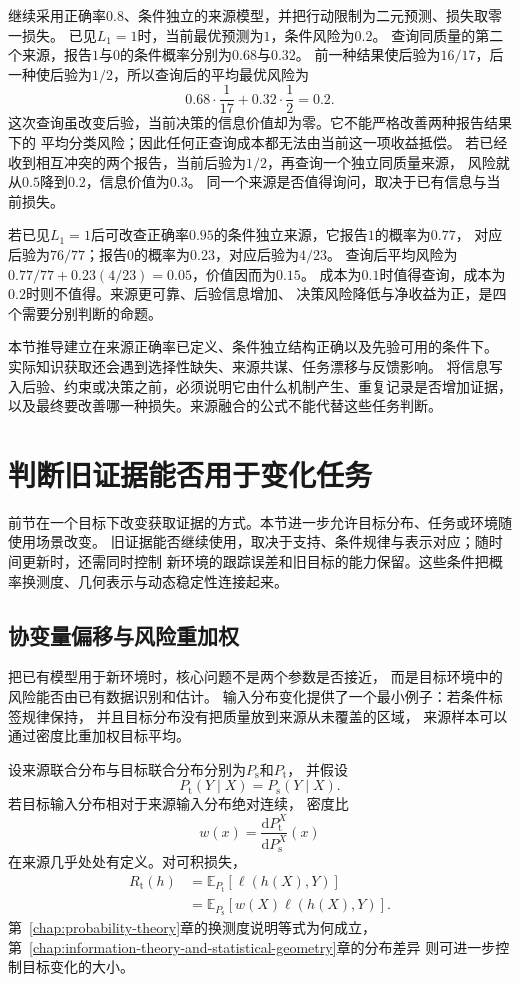 继续采用正确率$0.8$、条件独立的来源模型，并把行动限制为二元预测、损失取零一损失。
已见$L_1=1$时，当前最优预测为$1$，条件风险为$0.2$。
查询同质量的第二个来源，报告$1$与$0$的条件概率分别为$0.68$与$0.32$。
前一种结果使后验为$16/17$，后一种使后验为$1/2$，所以查询后的平均最优风险为
\[
  0.68\cdot\frac1{17}+0.32\cdot\frac12=0.2.
\]
这次查询虽改变后验，当前决策的信息价值却为零。它不能严格改善两种报告结果下的
平均分类风险；因此任何正查询成本都无法由当前这一项收益抵偿。
若已经收到相互冲突的两个报告，当前后验为$1/2$，再查询一个独立同质量来源，
风险就从$0.5$降到$0.2$，信息价值为$0.3$。
同一个来源是否值得询问，取决于已有信息与当前损失。

若已见$L_1=1$后可改查正确率$0.95$的条件独立来源，它报告$1$的概率为$0.77$，
对应后验为$76/77$；报告$0$的概率为$0.23$，对应后验为$4/23$。
查询后平均风险为$0.77/77+0.23(4/23)=0.05$，价值因而为$0.15$。
成本为$0.1$时值得查询，成本为$0.2$时则不值得。来源更可靠、后验信息增加、
决策风险降低与净收益为正，是四个需要分别判断的命题。

本节推导建立在来源正确率已定义、条件独立结构正确以及先验可用的条件下。
实际知识获取还会遇到选择性缺失、来源共谋、任务漂移与反馈影响。
将信息写入后验、约束或决策之前，必须说明它由什么机制产生、重复记录是否增加证据，
以及最终要改善哪一种损失。来源融合的公式不能代替这些任务判断。

\section{判断旧证据能否用于变化任务}
\label{sec:future-knowledge-evolution-transfer}

前节在一个目标下改变获取证据的方式。本节进一步允许目标分布、任务或环境随使用场景改变。
旧证据能否继续使用，取决于支持、条件规律与表示对应；随时间更新时，还需同时控制
新环境的跟踪误差和旧目标的能力保留。这些条件把概率换测度、几何表示与动态稳定性连接起来。

\subsection{协变量偏移与风险重加权}
\label{sec:future-input-shift-risk-reweighting}

把已有模型用于新环境时，核心问题不是两个参数是否接近，
而是目标环境中的风险能否由已有数据识别和估计。
输入分布变化提供了一个最小例子：若条件标签规律保持，
并且目标分布没有把质量放到来源从未覆盖的区域，
来源样本可以通过密度比重加权目标平均。

设来源联合分布与目标联合分布分别为$P_{\mathrm s}$和$P_{\mathrm t}$，
并假设
\[
  P_{\mathrm t}(Y\mid X)
  =
  P_{\mathrm s}(Y\mid X).
\]
若目标输入分布相对于来源输入分布绝对连续，
密度比
\[
  w(x)
  =
  \frac{\mathrm dP_{\mathrm t}^{X}}
  {\mathrm dP_{\mathrm s}^{X}}(x)
\]
在来源几乎处处有定义。对可积损失，
\begin{align}
  R_{\mathrm t}(h)
  &=
  \mathbb{E}_{P_{\mathrm t}}
  [\ell(h(X),Y)]
  \nonumber\\
  &=
  \mathbb{E}_{P_{\mathrm s}}
  \left[
    w(X)\ell(h(X),Y)
  \right].
  \label{eq:future-covariate-shift}
\end{align}
第~\ref{chap:probability-theory}章的换测度说明等式为何成立，
第~\ref{chap:information-theory-and-statistical-geometry}章的分布差异
则可进一步控制目标变化的大小。

